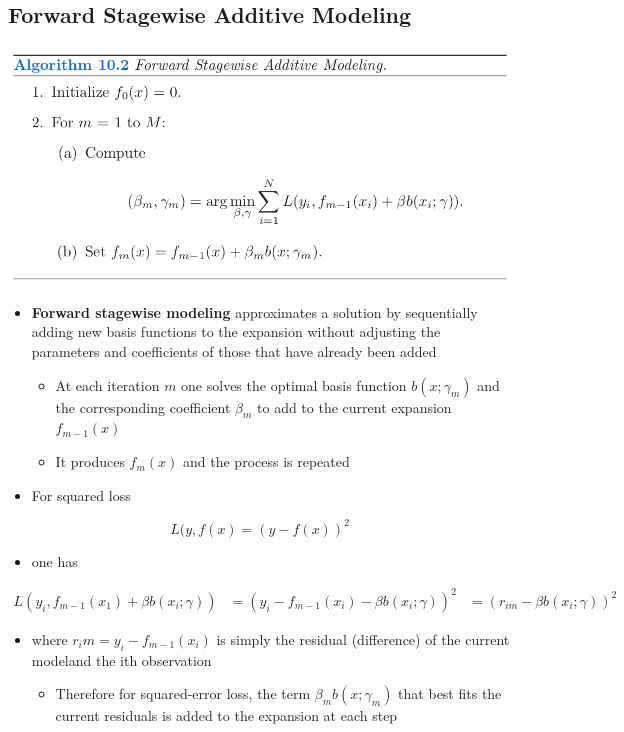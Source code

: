 \documentclass[11pt]{article}
\begin{document}
\subsection{Forward Stagewise Additive Modeling}
\label{sec:org51187d8}
\begin{center}
\includegraphics[width=.9\linewidth]{Boosting and Additive Trees/screenshot_2018-10-21_20-44-17.png}
\end{center}

\begin{itemize}
\item \textbf{Forward stagewise modeling} approximates a solution by sequentially adding new basis functions to the expansion without adjusting the parameters and coefficients of those that have already been added 
\begin{itemize}
\item At each iteration \(m\) one solves the optimal basis function \(b(x; \gamma_m)\) and the corresponding coefficient \(\beta_m\) to add to the current expansion \(f_{m-1}(x)\)
\item It produces \(f_m(x)\) and the process is repeated
\end{itemize}

\item For squared loss
\end{itemize}
\begin{equation}
	L(y,f(x)=(y-f(x))^2	
\end{equation}
\begin{itemize}
\item one has
\end{itemize}
\begin{equation}
  \begin{split} 
      L(y_i, f_{m-1}(x_1)+\beta b(x_i;\gamma)) &= (y_i-f_{m-1}(x_i)-\beta b(x_i;\gamma))^2
                                             &= (r_{im}-\beta b(x_i;\gamma))^2
  \end{split}
\end{equation}
\begin{itemize}
\item where \(r_im = y_i - f_{m-1}(x_i)\) is simply the residual (difference) of the current modeland the ith observation
\begin{itemize}
\item Therefore for squared-error loss, the term \(\beta_m b(x;\gamma_m)\) that best fits the current residuals is added to the expansion at each step
\end{itemize}
\end{itemize}
\end{document}
